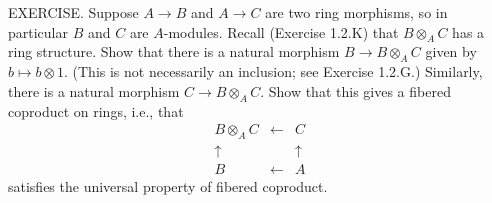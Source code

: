EXERCISE. Suppose $A\to B$ and $A\to C$ are two ring morphisms, so in particular $B$ and $C$ are $A$-modules. Recall (Exercise 1.2.K) that $B\otimes_A C$ has a ring structure. Show that there is a natural morphism $B\to B\otimes_A C$ given by $b\mapsto b\otimes1$. (This is not necessarily an inclusion; see Exercise 1.2.G.) Similarly, there is a natural morphism $C\to B\otimes_A C$. Show that this gives a fibered coproduct on rings, i.e., that
$$
\begin{array}{ccc}
B\otimes_A C &\longleftarrow& C\\
\uparrow && \uparrow\\
B &\longleftarrow& A
\end{array}
$$
satisfies the universal property of fibered coproduct.
